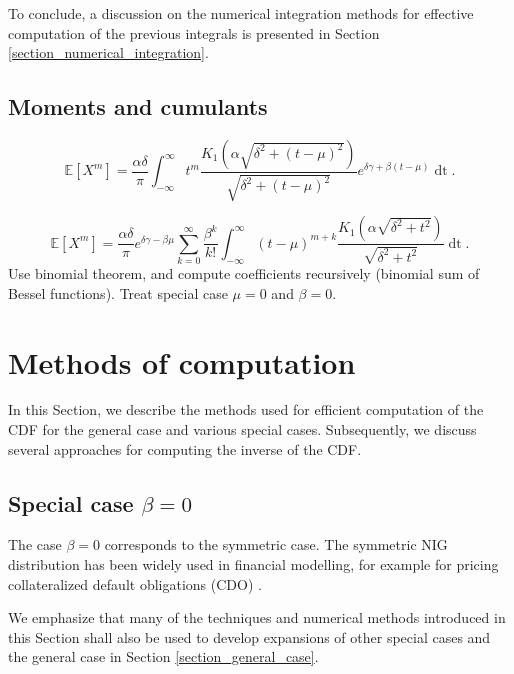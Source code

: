 \documentclass[10pt,a4paper,oneside]{article}
\numberwithin{equation}{section}
\begin{document}
To conclude, a discussion on the numerical integration methods for effective computation of the previous integrals is presented in Section \ref{section_numerical_integration}.

\subsection{Moments and cumulants}

\begin{equation}
\mathbb{E}[X^m] = \frac{\alpha \delta}{\pi} \int_{-\infty}^{\infty} t^m\frac{K_1\left(\alpha\sqrt{\delta^2 + (t-\mu)^2}\right)}{\sqrt{\delta^2 + (t-\mu)^2}} e^{\delta \gamma + \beta(t-\mu)} \mathop{dt}.
\end{equation}

\begin{equation}
\mathbb{E}[X^m] = \frac{\alpha \delta}{\pi} e^{\delta \gamma - \beta \mu} \sum_{k=0}^{\infty} \frac{\beta^k}{k!}\int_{-\infty}^{\infty} (t-\mu)^{m+k}\frac{K_1\left(\alpha\sqrt{\delta^2 + t^2}\right)}{\sqrt{\delta^2 + t^2}} \mathop{dt}.
\end{equation}
Use binomial theorem, and compute coefficients recursively (binomial sum of Bessel functions). Treat special case $\mu = 0$ and $\beta=0$.

\section{Methods of computation}
In this Section, we describe the methods used for efficient computation of the CDF for the general case and various special cases. Subsequently, we discuss several approaches for computing the inverse of the CDF.
\subsection{Special case $\beta = 0$}
The case $\beta = 0$ corresponds to the symmetric case. The symmetric NIG distribution has been widely used in financial modelling, for example for pricing collateralized default obligations (CDO) \cite{Kalemanova2007}.

We emphasize that many of the techniques and numerical methods introduced in this Section shall also be used to develop expansions of other special cases and the general case in Section \ref{section_general_case}.
\end{document}

